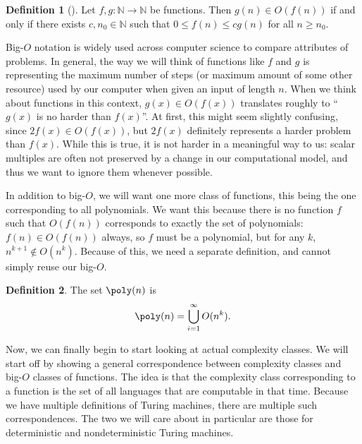 \documentclass[english,12pt]{reedthesis}
\theoremstyle{plain}
\theoremstyle{definition}
\newtheorem{defn}[defn]{Definition}
\theoremstyle{remark}
\begin{document}
\begin{defn}[{\cite[47]{CLRS}}]\label{def:big-o}
  Let $f, g\colon \mathbb{N} \rightarrow \mathbb{N}$ be functions. Then $g(n) \in O(f(n))$ if and only if
  there exists $c, n_{0} \in \mathbb{N}$ such that $0 \le f(n) \le cg(n)$ for all $n \ge n_{0}$.
\end{defn}

Big-$O$ notation is widely used across computer science to compare attributes of
problems. In general, the way we will think of functions like $f$ and $g$ is
representing the maximum number of steps (or maximum amount of some other
resource) used by our computer when given an input of length $n$. When we think
about functions in this context, $g(x) \in O(f(x))$ translates roughly to ``$g(x)$
is no harder than $f(x)$''. At first, this might seem slightly confusing, since
$2f(x) \in O(f(x))$, but $2f(x)$ definitely represents a harder problem than
$f(x)$. While this is true, it is not harder in a meaningful way to us: scalar
multiples are often not preserved by a change in our computational model, and
thus we want to ignore them whenever possible.

In addition to big-$O$, we will want one more class of functions, this being the
one corresponding to all polynomials. We want this because there is no function
$f$ such that $O(f(n))$ corresponds to exactly the set of polynomials:
$f(n) \in O(f(n))$ always, so $f$ must be a polynomial, but for any $k$,
$n^{k+1} \notin O(n^{k})$. Because of this, we need a separate definition, and cannot
simply reuse our big-$O$.

\begin{defn}\label{def:poly}
  The set $\poly(n)$ is
  \begin{equation*}
    \poly(n) = \bigcup_{i=1}^{\infty}O(n^{k}).
  \end{equation*}
\end{defn}

Now, we can finally begin to start looking at actual complexity classes. We will
start off by showing a general correspondence between complexity classes and
big-$O$ classes of functions. The idea is that the complexity class
corresponding to a function is the set of all languages that are computable in
that time. Because we have multiple definitions of Turing machines, there are
multiple such correspondences. The two we will care about in particular are
those for deterministic and nondeterministic Turing machines.
\end{document}
